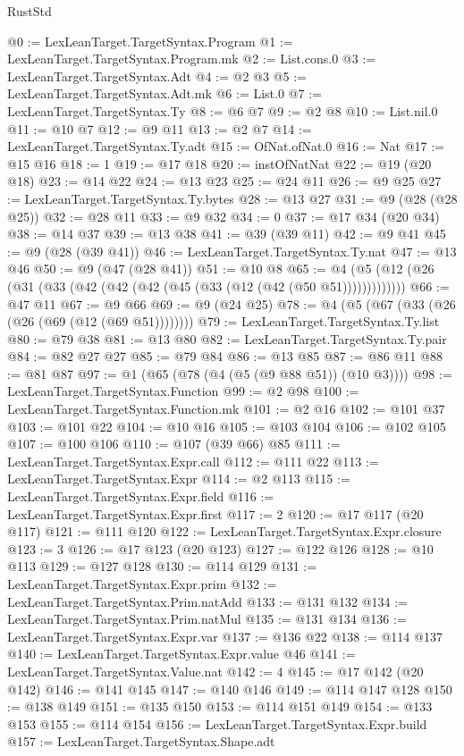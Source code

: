 \begin{lexlean}{RustStd}
\begin{coremodule}
@0 := LexLeanTarget.TargetSyntax.Program
@1 := LexLeanTarget.TargetSyntax.Program.mk
@2 := List.cons.{0}
@3 := LexLeanTarget.TargetSyntax.Adt
@4 := @2 @3
@5 := LexLeanTarget.TargetSyntax.Adt.mk
@6 := List.{0}
@7 := LexLeanTarget.TargetSyntax.Ty
@8 := @6 @7
@9 := @2 @8
@10 := List.nil.{0}
@11 := @10 @7
@12 := @9 @11
@13 := @2 @7
@14 := LexLeanTarget.TargetSyntax.Ty.adt
@15 := OfNat.ofNat.{0}
@16 := Nat
@17 := @15 @16
@18 := 1
@19 := @17 @18
@20 := instOfNatNat
@22 := @19 (@20 @18)
@23 := @14 @22
@24 := @13 @23
@25 := @24 @11
@26 := @9 @25
@27 := LexLeanTarget.TargetSyntax.Ty.bytes
@28 := @13 @27
@31 := @9 (@28 (@28 @25))
@32 := @28 @11
@33 := @9 @32
@34 := 0
@37 := @17 @34 (@20 @34)
@38 := @14 @37
@39 := @13 @38
@41 := @39 (@39 @11)
@42 := @9 @41
@45 := @9 (@28 (@39 @41))
@46 := LexLeanTarget.TargetSyntax.Ty.nat
@47 := @13 @46
@50 := @9 (@47 (@28 @41))
@51 := @10 @8
@65 := @4 (@5 (@12 (@26 (@31 (@33 (@42 (@42 (@42 (@45 (@33 (@12 (@42 (@50 @51)))))))))))))
@66 := @47 @11
@67 := @9 @66
@69 := @9 (@24 @25)
@78 := @4 (@5 (@67 (@33 (@26 (@26 (@69 (@12 (@69 @51))))))))
@79 := LexLeanTarget.TargetSyntax.Ty.list
@80 := @79 @38
@81 := @13 @80
@82 := LexLeanTarget.TargetSyntax.Ty.pair
@84 := @82 @27 @27
@85 := @79 @84
@86 := @13 @85
@87 := @86 @11
@88 := @81 @87
@97 := @1 (@65 (@78 (@4 (@5 (@9 @88 @51)) (@10 @3))))
@98 := LexLeanTarget.TargetSyntax.Function
@99 := @2 @98
@100 := LexLeanTarget.TargetSyntax.Function.mk
@101 := @2 @16
@102 := @101 @37
@103 := @101 @22
@104 := @10 @16
@105 := @103 @104
@106 := @102 @105
@107 := @100 @106
@110 := @107 (@39 @66) @85
@111 := LexLeanTarget.TargetSyntax.Expr.call
@112 := @111 @22
@113 := LexLeanTarget.TargetSyntax.Expr
@114 := @2 @113
@115 := LexLeanTarget.TargetSyntax.Expr.field
@116 := LexLeanTarget.TargetSyntax.Expr.first
@117 := 2
@120 := @17 @117 (@20 @117)
@121 := @111 @120
@122 := LexLeanTarget.TargetSyntax.Expr.closure
@123 := 3
@126 := @17 @123 (@20 @123)
@127 := @122 @126
@128 := @10 @113
@129 := @127 @128
@130 := @114 @129
@131 := LexLeanTarget.TargetSyntax.Expr.prim
@132 := LexLeanTarget.TargetSyntax.Prim.natAdd
@133 := @131 @132
@134 := LexLeanTarget.TargetSyntax.Prim.natMul
@135 := @131 @134
@136 := LexLeanTarget.TargetSyntax.Expr.var
@137 := @136 @22
@138 := @114 @137
@140 := LexLeanTarget.TargetSyntax.Expr.value @46
@141 := LexLeanTarget.TargetSyntax.Value.nat
@142 := 4
@145 := @17 @142 (@20 @142)
@146 := @141 @145
@147 := @140 @146
@149 := @114 @147 @128
@150 := @138 @149
@151 := @135 @150
@153 := @114 @151 @149
@154 := @133 @153
@155 := @114 @154
@156 := LexLeanTarget.TargetSyntax.Expr.build
@157 := LexLeanTarget.TargetSyntax.Shape.adt

\end{coremodule}
\end{lexlean}
